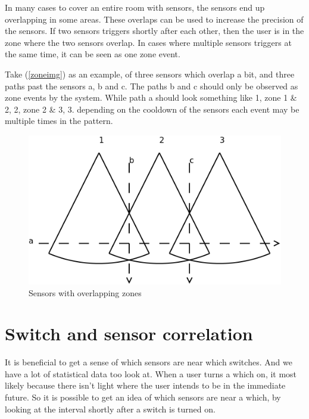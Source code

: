 In many cases to cover an entire room with sensors, the sensors end up overlapping in some areas. These overlaps can be used to increase the precision of the sensors. If two sensors triggers shortly after each other, then the user is in the zone where the two sensors overlap. In cases where multiple sensors triggers at the same time, it can be seen as one zone event.

Take (\autoref{zoneimg}) as an example, of three sensors which overlap a bit, and three paths past the sensors a, b and c. The paths b and c should only be observed as zone events by the system. While path a should look something like 1, zone 1 \& 2, 2, zone 2 \& 3, 3. depending on the cooldown of the sensors each event may be multiple times in the pattern.

\begin{figure}[htbp]
\centering
\includegraphics[keepaspectratio,width=\textwidth,height=0.75\textheight]{figures/zone.png}
\caption{Sensors with overlapping zones}
\label{zoneimg}
\end{figure}



\section{Switch and sensor correlation}
\label{switchandsensorcorrelation}

It is beneficial to get a sense of which sensors are near which switches. And we have a lot of statistical data too look at. When a user turns a which on, it most likely because there isn't light where the user intends to be in the immediate future. So it is possible to get an idea of which sensors are near a which, by looking at the interval shortly after a switch is turned on.

